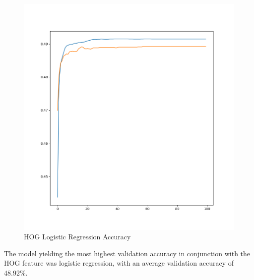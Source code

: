 \documentclass[11pt]{article}
\begin{document}
\begin{figure}[h]
	\centering
	\includegraphics[width=0.5 \textwidth]{figure/HOG_Log_Acc.png}
	\caption{HOG Logistic Regression Accuracy}
	\label{fig:HOG_Log_Acc}
\end{figure}
The model yielding the most highest validation accuracy in conjunction with the HOG feature was logistic regression, with an average validation accuracy of 48.92\%.
\end{document}
